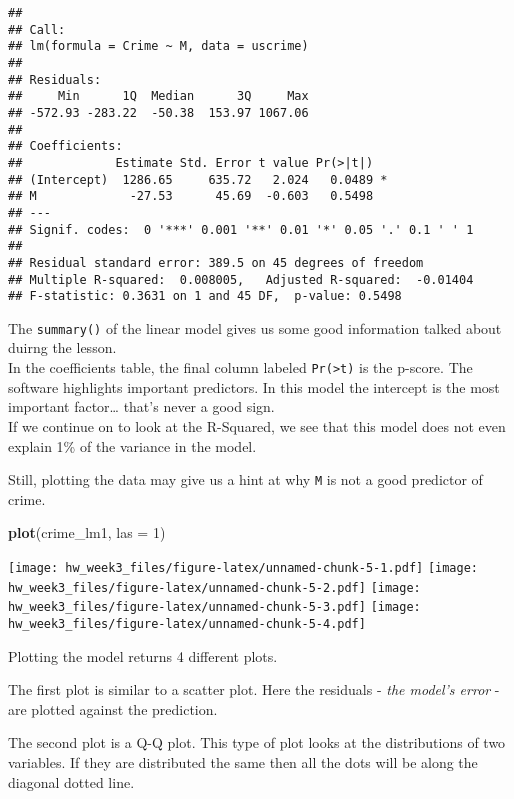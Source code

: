 \documentclass[]{article}
\newenvironment{Shaded}{\begin{snugshade}}{\end{snugshade}}
\newcommand{\KeywordTok}[1]{\textcolor[rgb]{0.13,0.29,0.53}{\textbf{#1}}}
\newcommand{\DataTypeTok}[1]{\textcolor[rgb]{0.13,0.29,0.53}{#1}}
\newcommand{\DecValTok}[1]{\textcolor[rgb]{0.00,0.00,0.81}{#1}}
\newcommand{\NormalTok}[1]{#1}
\begin{document}
\begin{verbatim}
## 
## Call:
## lm(formula = Crime ~ M, data = uscrime)
## 
## Residuals:
##     Min      1Q  Median      3Q     Max 
## -572.93 -283.22  -50.38  153.97 1067.06 
## 
## Coefficients:
##             Estimate Std. Error t value Pr(>|t|)  
## (Intercept)  1286.65     635.72   2.024   0.0489 *
## M             -27.53      45.69  -0.603   0.5498  
## ---
## Signif. codes:  0 '***' 0.001 '**' 0.01 '*' 0.05 '.' 0.1 ' ' 1
## 
## Residual standard error: 389.5 on 45 degrees of freedom
## Multiple R-squared:  0.008005,   Adjusted R-squared:  -0.01404 
## F-statistic: 0.3631 on 1 and 45 DF,  p-value: 0.5498
\end{verbatim}

The \texttt{summary()} of the linear model gives us some good
information talked about duirng the lesson.\\
In the coefficients table, the final column labeled
\texttt{Pr(\textgreater{}\textbar{}t\textbar{})} is the p-score. The
software highlights important predictors. In this model the intercept is
the most important factor\ldots{} that's never a good sign.\\
If we continue on to look at the R-Squared, we see that this model does
not even explain 1\% of the variance in the model.

Still, plotting the data may give us a hint at why \texttt{M} is not a
good predictor of crime.

\begin{Shaded}
\begin{Highlighting}[]
\KeywordTok{plot}\NormalTok{(crime_lm1, }\DataTypeTok{las =} \DecValTok{1}\NormalTok{)}
\end{Highlighting}
\end{Shaded}

\texttt{[image: hw\_week3\_files/figure-latex/unnamed-chunk-5-1.pdf]}
\texttt{[image: hw\_week3\_files/figure-latex/unnamed-chunk-5-2.pdf]}
\texttt{[image: hw\_week3\_files/figure-latex/unnamed-chunk-5-3.pdf]}
\texttt{[image: hw\_week3\_files/figure-latex/unnamed-chunk-5-4.pdf]}

Plotting the model returns 4 different plots.

The first plot is similar to a scatter plot. Here the residuals -
\emph{the model's error} - are plotted against the prediction.

The second plot is a Q-Q plot. This type of plot looks at the
distributions of two variables. If they are distributed the same then
all the dots will be along the diagonal dotted line.
\end{document}
